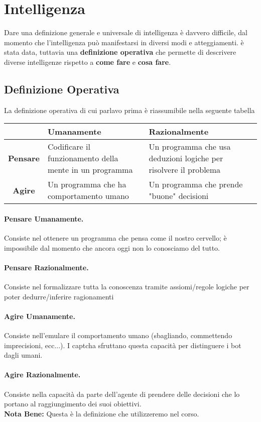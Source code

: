 \section{Intelligenza}
Dare una definizione generale e universale di intelligenza è davvero difficile, 
dal momento che l'intelligenza può manifestarsi in diversi modi e atteggiamenti. 
è stata data, tuttavia una \textbf{definizione operativa} che permette di descrivere diverse intelligenze rispetto a \textbf{come fare} e \textbf{cosa fare}.
\subsection{Definizione Operativa}
La definizione operativa di cui parlavo prima è riassumibile nella seguente tabella
\begin{table}[h]
    \centering
    \begin{tabular}{|c|p{5cm}|p{5cm}|}
        \hline
         & \textbf{Umanamente} & \textbf{Razionalmente} \\ \hline
        \textbf{Pensare} & Codificare il funzionamento della mente in un programma & Un programma che usa deduzioni logiche per risolvere il problema \\ \hline
        \textbf{Agire} & Un programma che ha comportamento umano & Un programma che prende "buone" decisioni \\ \hline
    \end{tabular}
\end{table}

\paragraph{Pensare Umanamente.} Consiste nel ottenere un programma che pensa come il nostro cervello; 
è impossibile dal momento che ancora oggi non lo conosciamo del tutto.
\paragraph{Pensare Razionalmente.} Consiste nel formalizzare tutta la conoscenza tramite assiomi/regole logiche per poter dedurre/inferire ragionamenti
\paragraph{Agire Umanamente.} Consiste nell'emulare il comportamento umano (sbagliando, commettendo imprecisioni, ecc...). I captcha sfruttano questa capacità per distinguere i bot dagli umani.
\paragraph{Agire Razionalmente.} Consiste nella capacità da parte dell'agente di prendere delle decisioni che lo portano al raggiungimento dei suoi obiettivi. \\\textbf{Nota Bene: }Questa è la definizione che utilizzeremo nel corso. 

